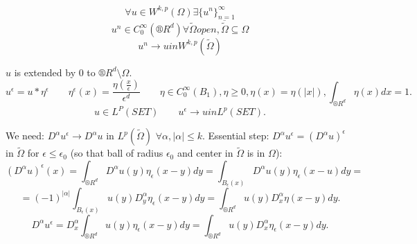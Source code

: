 \documentclass[12pt]{article}					%
\begin{document}

\begin{veta}
	$$ \forall u \in W^{k, p}(\Omega) \exists \{u^n\}_{n=1}^∞ $$
	$$ u^n \in C_0^∞(®R^d) \forall \tilde \Omega open, \overline{\tilde\Omega} \subseteq \Omega $$
	$$ u^n \rightarrow u in W^{k, p}(\tilde\Omega) $$

	\begin{dukazin}
		$u$ is extended by 0 to $®R^d \setminus \Omega$.
		$$ u^\epsilon = u * \eta^\epsilon \qquad \eta^\epsilon(x) = \frac{\eta(\frac{x}{\epsilon})}{\epsilon^d} \qquad \eta \in C_0^∞(B_1), \eta ≥ 0, \eta(x) = \eta(|x|), \int_{®R^d}\eta(x) dx = 1. $$
		$$ u \in L^P(SET) \qquad u^\epsilon \rightarrow u in L^p(SET). $$
		
		We need: $D^\alpha u^\epsilon \rightarrow D^\alpha u$ in $L^p(\tilde\Omega)$ $\forall \alpha, |\alpha| ≤ k$. Essential step: $D^\alpha u^\epsilon = (D^\alpha u)^\epsilon$ in $\tilde\Omega$ for $\epsilon ≤ \epsilon_0$ (so that ball of radius $\epsilon_0$ and center in $\tilde\Omega$ is in $\Omega$):
		$$ (D^\alpha u)^\epsilon(x) = \int_{®R^d} D^\alpha u(y) \eta_\epsilon(x-y) dy = \int_{B_\epsilon(x)} D^\alpha u(y) \eta_\epsilon(x - u) dy = $$
		$$ = (-1)^{|\alpha|} \int_{B_\epsilon(x)} u(y) D^\alpha_y \eta_\epsilon(x - y) dy = \int_{®R^d} u(y) D_x^\alpha \eta(x - y) dy. $$
		$$ D^\alpha u^\epsilon = D_x^\alpha \int_{®R^d} u(y) \eta_\epsilon(x - y) dy = \int_{®R^d} u(y) D_x^\alpha \eta_\epsilon(x - y) dy. $$
	\end{dukazin}
\end{veta}
\end{document}
